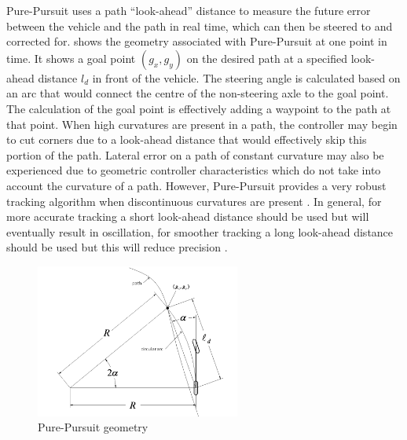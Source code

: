 \documentclass[main.tex]{subfiles}
\begin{document}
Pure-Pursuit uses a path ``look-ahead'' distance to measure the future error between the vehicle and the path in real time, which can then be steered to and corrected for.  shows the geometry associated with Pure-Pursuit at one point in time. It shows a goal point $(g_x, g_y)$ on the desired path at a specified look-ahead distance $l_d$ in front of the vehicle. The steering angle is calculated based on an arc that would connect the centre of the non-steering axle to the goal point. The calculation of the goal point is effectively adding a waypoint to the path at that point. When high curvatures are present in a path, the controller may begin to cut corners due to a look-ahead distance that would effectively skip this portion of the path. Lateral error on a path of constant curvature may also be experienced due to geometric controller characteristics which do not take into account the curvature of a path. However, Pure-Pursuit provides a very robust tracking algorithm when discontinuous curvatures are present \parencite{snider2009}. In general, for more accurate tracking a short look-ahead distance should be used but will eventually result in oscillation, for smoother tracking a long look-ahead distance should be used but this will reduce precision \parencite{snider2009}.
\begin{figure}[ht]
\includegraphics[width=0.6\textwidth]{2-LiteratureReview/purePursuitGoal.png}
\centering
\caption[Pure Pursuit geometry]{Pure-Pursuit geometry \parencite{snider2009}} 
\end{figure}

%
%
\end{document}
